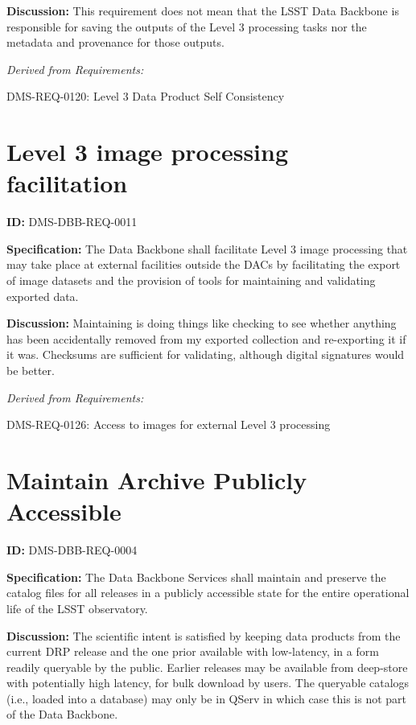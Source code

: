 \documentclass[SE,toc,lsstdraft]{lsstdoc}
\begin{document}
\textbf{Discussion:}
This requirement does not mean that the LSST Data Backbone is responsible for saving the outputs of the Level 3 processing tasks nor the metadata and provenance for those outputs.

\emph{Derived from Requirements:}

DMS-REQ-0120:
Level 3 Data Product Self Consistency \newline

\section{Level 3 image processing facilitation}

\label{DMS-DBB-REQ-0011}
\textbf{ID:} DMS-DBB-REQ-0011

\textbf{Specification:}
The Data Backbone shall facilitate Level 3 image processing that may take place at external
 facilities outside the DACs by facilitating the export of image
 datasets and the provision of tools for maintaining and validating exported data.

\textbf{Discussion:}
Maintaining is doing things like checking to see whether anything has been accidentally removed from my exported collection and re-exporting it if it was.  Checksums are sufficient for validating, although digital signatures would be better.

\emph{Derived from Requirements:}

DMS-REQ-0126:
Access to images for external Level 3 processing \newline

\section{Maintain Archive Publicly Accessible}

\label{DMS-DBB-REQ-0004}
\textbf{ID:} DMS-DBB-REQ-0004

\textbf{Specification:}
The Data Backbone Services shall maintain and preserve the catalog files for all releases in a publicly accessible state for the entire operational life of the LSST observatory.

\textbf{Discussion:}
The scientific intent is satisfied by keeping data products from the current DRP release and the one prior available with low-latency, in a form readily queryable by the public. Earlier releases may be available from deep-store with potentially high latency, for bulk download by users.    The queryable catalogs (i.e., loaded into a database) may only be in QServ in which case this is not part of the Data Backbone.
\end{document}
